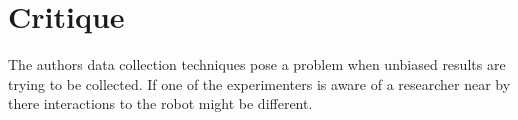 \documentclass{article}
\begin{document}
\section*{Critique}
The authors data collection techniques pose a problem when unbiased results are trying to be collected. If one of the experimenters is aware of a researcher near by there interactions to the robot might be different.
\cite{Mutlu:2008:ROR:1349822.1349860}
\end{document}
